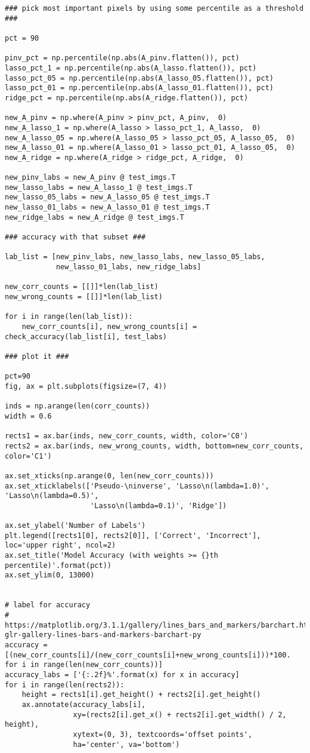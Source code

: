 \documentclass[10pt]{article}
\begin{document}
\begin{lstlisting}
### pick most important pixels by using some percentile as a threshold ###

pct = 90

pinv_pct = np.percentile(np.abs(A_pinv.flatten()), pct)
lasso_pct_1 = np.percentile(np.abs(A_lasso.flatten()), pct)
lasso_pct_05 = np.percentile(np.abs(A_lasso_05.flatten()), pct)
lasso_pct_01 = np.percentile(np.abs(A_lasso_01.flatten()), pct)
ridge_pct = np.percentile(np.abs(A_ridge.flatten()), pct)

new_A_pinv = np.where(A_pinv > pinv_pct, A_pinv,  0)
new_A_lasso_1 = np.where(A_lasso > lasso_pct_1, A_lasso,  0)
new_A_lasso_05 = np.where(A_lasso_05 > lasso_pct_05, A_lasso_05,  0)
new_A_lasso_01 = np.where(A_lasso_01 > lasso_pct_01, A_lasso_05,  0)
new_A_ridge = np.where(A_ridge > ridge_pct, A_ridge,  0)

new_pinv_labs = new_A_pinv @ test_imgs.T
new_lasso_labs = new_A_lasso_1 @ test_imgs.T
new_lasso_05_labs = new_A_lasso_05 @ test_imgs.T
new_lasso_01_labs = new_A_lasso_01 @ test_imgs.T
new_ridge_labs = new_A_ridge @ test_imgs.T

### accuracy with that subset ###

lab_list = [new_pinv_labs, new_lasso_labs, new_lasso_05_labs,
            new_lasso_01_labs, new_ridge_labs]

new_corr_counts = [[]]*len(lab_list)
new_wrong_counts = [[]]*len(lab_list)

for i in range(len(lab_list)):
    new_corr_counts[i], new_wrong_counts[i] = check_accuracy(lab_list[i], test_labs)
    
### plot it ###

pct=90
fig, ax = plt.subplots(figsize=(7, 4))

inds = np.arange(len(corr_counts))
width = 0.6

rects1 = ax.bar(inds, new_corr_counts, width, color='C0')
rects2 = ax.bar(inds, new_wrong_counts, width, bottom=new_corr_counts, color='C1')

ax.set_xticks(np.arange(0, len(new_corr_counts)))
ax.set_xticklabels(['Pseudo-\ninverse', 'Lasso\n(lambda=1.0)', 'Lasso\n(lambda=0.5)',
                    'Lasso\n(lambda=0.1)', 'Ridge'])

ax.set_ylabel('Number of Labels')
plt.legend([rects1[0], rects2[0]], ['Correct', 'Incorrect'], loc='upper right', ncol=2)
ax.set_title('Model Accuracy (with weights >= {}th percentile)'.format(pct))
ax.set_ylim(0, 13000)


# label for accuracy
# https://matplotlib.org/3.1.1/gallery/lines_bars_and_markers/barchart.html#sphx-glr-gallery-lines-bars-and-markers-barchart-py
accuracy = [(new_corr_counts[i]/(new_corr_counts[i]+new_wrong_counts[i]))*100. for i in range(len(new_corr_counts))]
accuracy_labs = ['{:.2f}%'.format(x) for x in accuracy]
for i in range(len(rects2)):
    height = rects1[i].get_height() + rects2[i].get_height()
    ax.annotate(accuracy_labs[i],
                xy=(rects2[i].get_x() + rects2[i].get_width() / 2, height),
                xytext=(0, 3), textcoords='offset points',
                ha='center', va='bottom')


\end{lstlisting}
\end{document}
